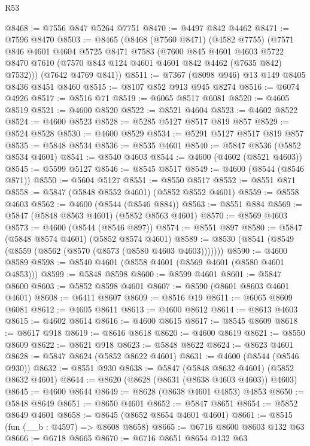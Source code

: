 \begin{lexlean}{R53}
\begin{coremodule}
@8468 := @7556 @847 @5264 @7751
@8470 := @4497 @842 @4462
@8471 := @7596 @8470
@8503 := @8465
    (@8468
      (@7560 @8471)
      (@4582 @7755)
      (@7571
        @846
        @4601
        @4604
        @5725
        @8471
        @7583
        (@7600
          @845
          @4601
          @4603
          @5722
          @8470
          @7610
          (@7570 @843 @124 @4601 @4601 @842 @4462 (@7635 @842) @7532)))
      (@7642 @4769 @841))
@8511 := @7367 (@8098 @946) @13 @149 @8405 @8436 @8451 @8460
@8515 := @8107 @852 @913 @945 @8274
@8516 := @6074 @4926
@8517 := @8516 @71
@8519 := @6065 @8517 @6081
@8520 := @4605 @8519
@8521 := @4600 @8520
@8522 := @8521 @4604
@8523 := @4602 @8522
@8524 := @4600 @8523
@8528 := @5285 @5127 @8517 @819 @857
@8529 := @8524 @8528
@8530 := @4600 @8529
@8534 := @5291 @5127 @8517 @819 @857
@8535 := @5848 @8534
@8536 := @8535 @4601
@8540 := @5847 @8536 (@5852 @8534 @4601)
@8541 := @8540 @4603
@8544 := @4600 (@4602 (@8521 @4603))
@8545 := @5599 @5127
@8546 := @8545 @8517
@8549 := @4600 (@8544 (@8546 @871))
@8550 := @5604 @5127
@8551 := @8550 @8517
@8552 := @8551 @871
@8558 := @5847 (@5848 @8552 @4601) (@5852 @8552 @4601)
@8559 := @8558 @4603
@8562 := @4600 (@8544 (@8546 @884))
@8563 := @8551 @884
@8569 := @5847 (@5848 @8563 @4601) (@5852 @8563 @4601)
@8570 := @8569 @4603
@8573 := @4600 (@8544 (@8546 @897))
@8574 := @8551 @897
@8580 := @5847 (@5848 @8574 @4601) (@5852 @8574 @4601)
@8589 := @8530 (@8541 (@8549 (@8559 (@8562 (@8570 (@8573 (@8580 @4603 @4603)))))))
@8590 := @4600 @8589
@8598 := @8540 @4601 (@8558 @4601 (@8569 @4601 (@8580 @4601 @4853)))
@8599 := @5848 @8598
@8600 := @8599 @4601
@8601 := @5847 @8600
@8603 := @5852 @8598 @4601
@8607 := @8590 (@8601 @8603 @4601 @4601)
@8608 := @6411 @8607
@8609 := @8516 @19
@8611 := @6065 @8609 @6081
@8612 := @4605 @8611
@8613 := @4600 @8612
@8614 := @8613 @4603
@8615 := @4602 @8614
@8616 := @4600 @8615
@8617 := @8545 @8609
@8618 := @8617 @918
@8619 := @8616 @8618
@8620 := @4600 @8619
@8621 := @8550 @8609
@8622 := @8621 @918
@8623 := @5848 @8622
@8624 := @8623 @4601
@8628 := @5847 @8624 (@5852 @8622 @4601)
@8631 := @4600 (@8544 (@8546 @930))
@8632 := @8551 @930
@8638 := @5847 (@5848 @8632 @4601) (@5852 @8632 @4601)
@8644 := @8620 (@8628 (@8631 (@8638 @4603 @4603)) @4603)
@8645 := @4600 @8644
@8649 := @8628 (@8638 @4601 @4853) @4853
@8650 := @5848 @8649
@8651 := @8650 @4601
@8652 := @5847 @8651
@8654 := @5852 @8649 @4601
@8658 := @8645 (@8652 @8654 @4601 @4601)
@8661 := @8515 (fun (__b : @4597) => @8608 @8658)
@8665 := @6716 @8600 @8603 @132 @63
@8666 := @6718 @8665
@8670 := @6716 @8651 @8654 @132 @63

\end{coremodule}
\end{lexlean}
